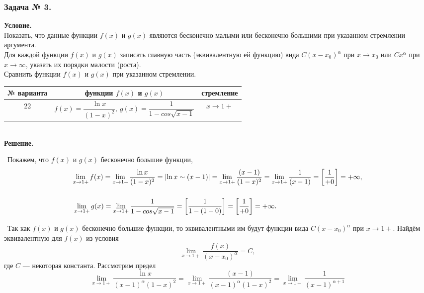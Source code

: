 \documentclass[12pt]{article}
\begin{document}
	\subsubsection*{\center Задача № 3.}
	{\bf Условие.~}\\
	 Показать, что данные функции
	$f(x)$ и $g(x)$ являются бесконечно малыми или бесконечно большими
	при указанном стремлении аргумента. \\
	 Для каждой функции $f(x)$ и $g(x)$ записать главную часть
	(эквивалентную ей функцию)  вида $C(x-x_0)^{\alpha}$ при $x\rightarrow x_0$ или $Cx^{\alpha}$
	при $x\rightarrow\infty$, указать их порядки малости (роста). \\
	 Сравнить функции $f(x)$ и $g(x)$ при указанном стремлении.
	\begin{center}
		\begin{tabular}{|c|c|c|}
			\hline
			№ варианта & функции $f(x)$ и $g(x)$ & стремление \\[6pt]
			\hline
			22 & $f(x) = \dfrac{\ln{x}}{(1-x)^2},~g(x)=\dfrac{1}{1-cos\sqrt{x-1}}$ & $x\rightarrow1+$ \\
			\hline
		\end{tabular}
		\bigskip
		\\
		{\bf Решение.~}\\
	\end{center}
	\medskip
	~Покажем, что $f(x)$ и $g(x)$ бесконечно большие функции,
	$$
	\begin{array}{l} 
		\lim\limits_{x\rightarrow 1+} f(x)=\lim\limits_{x\rightarrow 1+} \dfrac{\ln{x}}{(1-x)^2}=\left|\ln {x} \sim (x-1) \right|=\lim\limits_{x\rightarrow 1+} \dfrac{(x-1)}{(1-x)^2}=\lim\limits_{x\rightarrow 1+} \dfrac{1}{(x-1)}=\left[\dfrac{1}{+0} \right]=+\infty , 
		\\ \medskip{}{}
		\\ \medskip{}{}
		\lim\limits_{x\rightarrow 1+} g(x)= \lim\limits_{x\rightarrow 1+}  \dfrac{1}{1-cos\sqrt{x-1}}=\left[\dfrac{1}{1-(1-0)} \right]=\left[\dfrac{1}{+0} \right]=+\infty.
	\end{array}
	$$
	~Так как $f(x)$ и $g(x)$ бесконечно большие функции, то эквивалентными им будут функции вида 
	$C(x-x_0)^{\alpha}$ при $x\rightarrow 1+$. Найдём эквивалентную для $f(x)$ из условия
	$$
	\lim\limits_{x\rightarrow 1+}\dfrac{f(x)}{(x-x_0)^{\alpha}} = C,
	$$
	где $C$ --- некоторая константа. Рассмотрим предел
	$$
	\lim\limits_{x\rightarrow 1+} \dfrac{\ln{x}}{(x-1)^{\alpha} (1-x)^2}=\lim\limits_{x\rightarrow 1+} \dfrac{(x-1)}{(x-1)^{\alpha}(1-x)^2}=\lim\limits_{x\rightarrow 1+} \dfrac{1}{(x-1)^{\alpha+1}}
	$$
\end{document}
